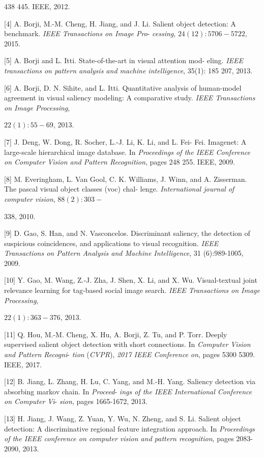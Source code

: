 \documentclass[a4paper,10pt]{article}
\begin{document}
438 445. IEEE, 2012.

[4] A. Borji, M.-M. Cheng, H. Jiang, and J. Li. Salient object detection: A benchmark. {\it IEEE Transactions on Image Pro}- {\it cessing}, $24(12):5706-5722$, 2015.

[5] A. Borji and L. Itti. State-of-the-art in visual attention mod- eling. {\it IEEE transactions on pattern analysis and machine intelligence}, 35(1): 185 207, 2013.

[6] A. Borji, D. N. Sihite, and L. Itti. Quantitative analysis of human-model agreement in visual saliency modeling: $\mathrm{A}$ comparative study. {\it IEEE Transactions on Image Processing},
\begin{center}
$22(1):55-69$, 2013.
\end{center}
[7] J. Deng, W. Dong, R. Socher, L.-J. Li, K. Li, and L. Fei- Fei. Imagenet: A large-scale hierarchical image database. In {\it Proceedings of the IEEE Conference on Computer Vision and Pattern Recognition}, pages 248 255. IEEE, 2009.

[8] M. Everingham, L. Van Gool, C. K. Williams, J. Winn, and A. Zisserman. The pascal visual object classes (voc) chal- lenge. {\it International journal of computer vision}, $88(2):303-$
\begin{center}
338, 2010.
\end{center}
[9] D. Gao, S. Han, and N. Vasconcelos. Discriminant saliency, the detection of suspicious coincidences, and applications to visual recognition. {\it IEEE Transactions on Pattern Analysis and Machine Intelligence}, 31 (6):989-1005, 2009.

[10] Y. Gao, M. Wang, Z.-J. Zha, J. Shen, X. Li, and X. Wu. Visual-textual joint relevance learning for tag-based social image search. {\it IEEE Transactions on Image Processing},
\begin{center}
$22(1):363-376$, 2013.
\end{center}
[11] Q. Hou, M.-M. Cheng, X. Hu, A. Borji, Z. Tu, and P. Torr. Deeply supervised salient object detection with short connections. In {\it Computer Vision and Pattern Recogni}- {\it tion} ({\it CVPR}), {\it 2017 IEEE Conference on}, pages 5300 5309. IEEE, 2017.

[12] B. Jiang, L. Zhang, H. Lu, C. Yang, and M.-H. Yang. Saliency detection via absorbing markov chain. In {\it Proceed}- {\it ings of the IEEE International Conference on Computer Vi}- {\it sion}, pages 1665-1672, 2013.

[13] H. Jiang, J. Wang, Z. Yuan, Y. Wu, N. Zheng, and S. Li. Salient object detection: A discriminative regional feature integration approach. In {\it Proceedings of the IEEE conference on computer vision and pattern recognition}, pages 2083- 2090, 2013.
\end{document}
